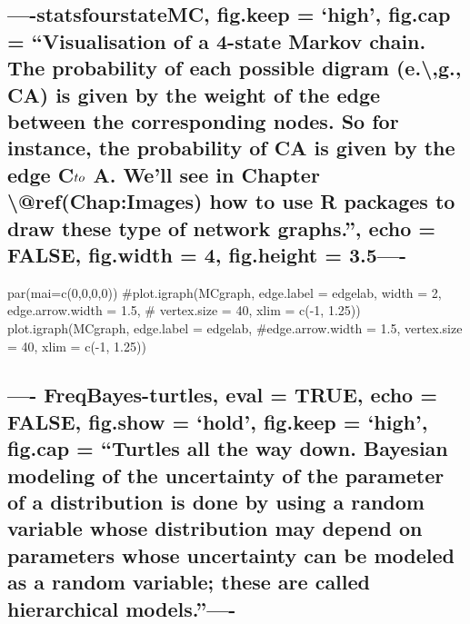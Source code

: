 \documentclass[]{article}
\begin{document}
\subsection{\texorpdfstring{----statsfourstateMC, fig.keep = `high',
fig.cap = ``Visualisation of a 4-state Markov chain. The probability of
each possible digram (e.\textbackslash{},g., CA) is given by the weight
of the edge between the corresponding nodes. So for instance, the
probability of CA is given by the edge C\(\\to\) A. We'll see in Chapter
\textbackslash{}@ref(Chap:Images) how to use \textbf{R} packages to draw
these type of network graphs.'', echo = FALSE, fig.width = 4, fig.height
=
3.5----}{----statsfourstateMC, fig.keep = high, fig.cap = Visualisation of a 4-state Markov chain. The probability of each possible digram (e.\textbackslash{},g., CA) is given by the weight of the edge between the corresponding nodes. So for instance, the probability of CA is given by the edge C\textbackslash{}\textbackslash{}to A. We'll see in Chapter \textbackslash{}@ref(Chap:Images) how to use R packages to draw these type of network graphs., echo = FALSE, fig.width = 4, fig.height = 3.5----}}\label{statsfourstatemc-fig.keep-high-fig.cap-visualisation-of-a-4-state-markov-chain.-the-probability-of-each-possible-digram-e.g.-ca-is-given-by-the-weight-of-the-edge-between-the-corresponding-nodes.-so-for-instance-the-probability-of-ca-is-given-by-the-edge-cto-a.-well-see-in-chapter-refchapimages-how-to-use-r-packages-to-draw-these-type-of-network-graphs.-echo-false-fig.width-4-fig.height-3.5-}

par(mai=c(0,0,0,0)) \#plot.igraph(MCgraph, edge.label = edgelab, width =
2, edge.arrow.width = 1.5, \# vertex.size = 40, xlim = c(-1, 1.25))
plot.igraph(MCgraph, edge.label = edgelab, \#edge.arrow.width = 1.5,
vertex.size = 40, xlim = c(-1, 1.25))

\subsection{\texorpdfstring{---- FreqBayes-turtles, eval = TRUE, echo =
FALSE, fig.show = `hold', fig.keep = `high', fig.cap = ``Turtles all the
way down. Bayesian modeling of the uncertainty of the parameter of a
distribution is done by using a random variable whose distribution may
depend on parameters whose uncertainty can be modeled as a random
variable; these are called hierarchical
models.''----}{---- FreqBayes-turtles, eval = TRUE, echo = FALSE, fig.show = hold, fig.keep = high, fig.cap = Turtles all the way down. Bayesian modeling of the uncertainty of the parameter of a distribution is done by using a random variable whose distribution may depend on parameters whose uncertainty can be modeled as a random variable; these are called hierarchical models.----}}\label{freqbayes-turtles-eval-true-echo-false-fig.show-hold-fig.keep-high-fig.cap-turtles-all-the-way-down.-bayesian-modeling-of-the-uncertainty-of-the-parameter-of-a-distribution-is-done-by-using-a-random-variable-whose-distribution-may-depend-on-parameters-whose-uncertainty-can-be-modeled-as-a-random-variable-these-are-called-hierarchical-models.-}
\end{document}
